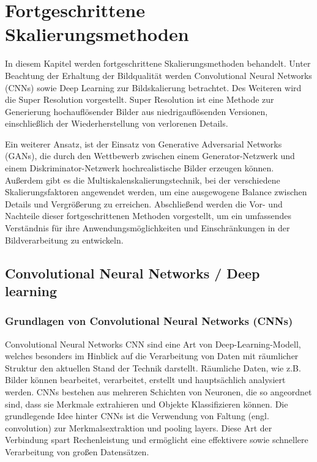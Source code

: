 


\chapter{Fortgeschrittene Skalierungsmethoden}

In diesem Kapitel werden fortgeschrittene Skalierungsmethoden behandelt.
Unter Beachtung der Erhaltung der Bildqualität werden Convolutional Neural Networks (CNNs) sowie Deep Learning zur Bildskalierung betrachtet.
Des Weiteren wird die Super Resolution vorgestellt.
Super Resolution ist eine Methode zur Generierung hochauflösender Bilder aus niedrigauflösenden Versionen, einschließlich der Wiederherstellung von verlorenen Details.

Ein weiterer Ansatz, ist der Einsatz von Generative Adversarial Networks (GANs), die durch den Wettbewerb zwischen einem Generator-Netzwerk und einem Diskriminator-Netzwerk hochrealistische Bilder erzeugen können.
Außerdem gibt es die Multiskalenskalierungstechnik, bei der verschiedene Skalierungsfaktoren angewendet werden, um eine ausgewogene Balance zwischen Details und Vergrößerung zu erreichen.
Abschließend werden die Vor- und Nachteile dieser fortgeschrittenen Methoden vorgestellt, um ein umfassendes Verständnis für ihre Anwendungsmöglichkeiten und Einschränkungen in der Bildverarbeitung zu entwickeln.


\section{Convolutional Neural Networks / Deep learning}
    \subsection{Grundlagen von Convolutional Neural Networks (CNNs)}
        Convolutional Neural Networks \ac{CNN} sind eine Art von Deep-Learning-Modell, welches besonders im Hinblick auf die Verarbeitung von Daten mit räumlicher Struktur den aktuellen Stand der Technik darstellt.      
        Räumliche Daten, wie z.B.      Bilder können bearbeitet, verarbeitet, erstellt und hauptsächlich analysiert werden.      
        CNNs bestehen aus mehreren Schichten von Neuronen, die so angeordnet sind, dass sie Merkmale extrahieren und Objekte Klassifizieren können.
        Die grundlegende Idee hinter CNNs ist die Verwendung von Faltung (engl.      convolution) zur Merkmalsextraktion und pooling layers.      
        Diese Art der Verbindung spart Rechenleistung und ermöglicht eine effektivere sowie schnellere Verarbeitung von großen Datensätzen.
